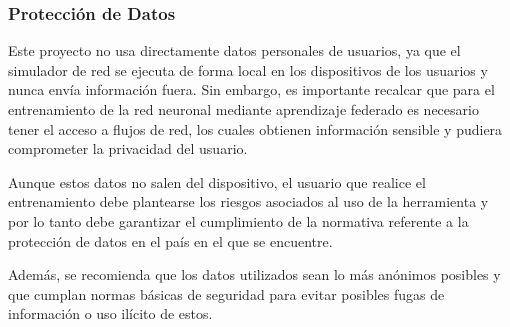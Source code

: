 \subsubsection{Protección de Datos}
\label{subsubsec:ProteccionDatos}
Este proyecto no usa directamente datos personales de usuarios, ya que el simulador de red se ejecuta de forma local en los dispositivos de los usuarios y nunca envía información fuera. Sin embargo, es importante recalcar que para el entrenamiento de la red neuronal mediante aprendizaje federado es necesario tener el acceso a flujos de red, los cuales obtienen información sensible y pudiera comprometer la privacidad del usuario.

Aunque estos datos no salen del dispositivo, el usuario que realice el entrenamiento debe plantearse los riesgos asociados al uso de la herramienta y por lo tanto debe garantizar el cumplimiento de la normativa referente a la protección de datos en el país en el que se encuentre.

Además, se recomienda que los datos utilizados sean lo más anónimos posibles y que cumplan normas básicas de seguridad para evitar posibles fugas de información o uso ilícito de estos.

